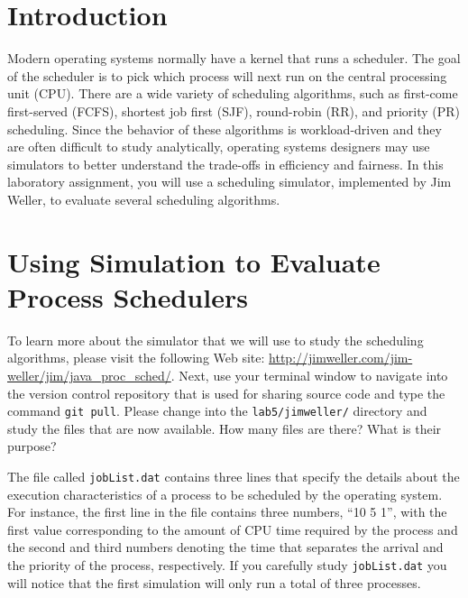 


\usepackage[compact]{titlesec}



\section*{Introduction}

  Modern operating systems normally have a kernel that runs a scheduler.  The goal of the scheduler is to pick which
  process will next run on the central processing unit (CPU).  There are a wide variety of scheduling algorithms, such
  as first-come first-served (FCFS), shortest job first (SJF), round-robin (RR), and priority (PR) scheduling.  Since
  the behavior of these algorithms is \mbox{workload-driven} and they are often difficult to study analytically,
  operating systems designers may use simulators to better understand the trade-offs in efficiency and fairness. In
  this laboratory assignment, you will use a scheduling simulator, implemented by Jim Weller, to evaluate several
  scheduling algorithms.


\section*{Using Simulation to Evaluate Process Schedulers}

  To learn more about the simulator that we will use to study the scheduling algorithms, please visit the following Web
  site: \url{http://jimweller.com/jim-weller/jim/java_proc_sched/}. Next, use your terminal window to navigate into the
  version control repository that is used for sharing source code and type the command {\tt git pull}.  Please change
  into the {\tt lab5/jimweller/} directory and study the files that are now available. How many files are there? What is
  their purpose?

  The file called {\tt jobList.dat} contains three lines that specify the details about the execution characteristics of
  a process to be scheduled by the operating system.  For instance, the first line in the file contains three numbers,
  ``10 5 1'', with the first value corresponding to the amount of CPU time required by the process and the second and
  third numbers denoting the time that separates the arrival and the priority of the process, respectively. If you
  carefully study {\tt jobList.dat} you will notice that the first simulation will only run a total of three processes.

